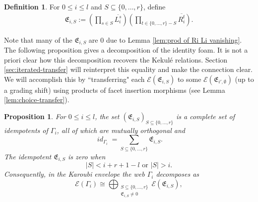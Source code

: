 \documentclass[12pt]{amsart}
\newtheorem{proposition}[theorem]{Proposition}
\theoremstyle{definition}
\newtheorem{definition}[theorem]{Definition}
\theoremstyle{remark}
\numberwithin{equation}{section}
\numberwithin{figure}{section}
\newcommand{\Li}[2]{\overline{L^{#1}_{#2}}}
\newcommand{\Ri}[2]{\overline{R^{#1}_{#2}}}
\newcommand{\osum}{\bigoplus}
\DeclareMathOperator{\idfoam}{\mathit{id}}
\begin{document}
\begin{definition}\label{def:def Eis}
    For $0\leq i\leq l$ and $S\subseteq\{0,\ldots,r\}$, define
\begin{align}\label{eq:exact-word-projector}
 \mathfrak{E}_{i,S}:=
 \left(\prod_{s\in S}\Li{s}{i}\right)
 \left(\prod_{t\in\{0,\ldots,r\}- S}\Ri{t}{i}\right).
\end{align}
\end{definition}

Note that many of the $\mathfrak{E}_{i,S}$ are $0$ due to Lemma \ref{lem:prod of Ri Li vanishing}. The following proposition gives a decomposition of the identity foam. It is not a priori clear how this decomposition recovers the Kekulé relations. Section \ref{sec:iterated-transfer} will reinterpret this equality and make the connection clear. We will accomplish this by ``transferring" each $\mathcal{E}(\mathfrak{E}_{i,S})$ to some $\mathcal{E}(\mathfrak{E}_{i',\emptyset})$ (up to a grading shift) using products of facet insertion morphisms (see Lemma \ref{lem:choice-transfer}).

\begin{proposition}\label{prop:exact-word-projectors}
For $0\leq i\leq l$, the set $(\mathfrak{E}_{i,S})_{S\subseteq \{0,\ldots,r\}}$ is a complete set of idempotents of $\Gamma_i$, all of which are mutually orthogonal and
\begin{equation}\label{eq:exact-word-sum}
 \idfoam_{\Gamma_i}=\sum_{S\subseteq\{0,\ldots,r\}}\mathfrak{E}_{i,S}.
\end{equation}
The idempotent $\mathfrak{E}_{i,S}$ is zero when
\begin{equation}\label{eq:exact-word-cardinality}
 |S| < i+r+1-l \text{ or } |S| > i .
\end{equation}
Consequently, in the Karoubi envelope the web $\Gamma_i$ decomposes as
\begin{equation}\label{eq:web-karoubi-decomposition}
 \mathcal{E}(\Gamma_i)\cong
 \osum_{\substack{S\subseteq\{0,\ldots,r\}\\\mathfrak{E}_{i,S}\neq0}}
 \mathcal{E}(\mathfrak{E}_{i,S}),
\end{equation}
\end{proposition}
\end{document}
